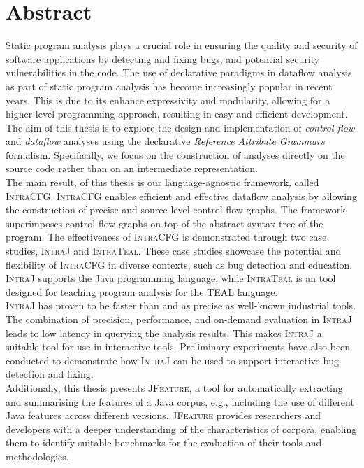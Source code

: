 \chapter{Abstract}


Static program analysis plays a crucial role in ensuring the quality and security of
software applications by detecting and fixing bugs,
and potential security vulnerabilities in the code. The use of declarative
paradigms in dataflow analysis as part of static program analysis has become 
increasingly popular in recent years. This is due to its enhance expressivity 
and modularity, allowing for a higher-level programming approach, resulting in
easy and efficient development.\\[5pt]

The aim of this thesis is to explore the design and implementation of \emph{control-flow} and 
\emph{dataflow} analyses using the declarative \emph{Reference Attribute Grammars} formalism.
Specifically, we focus on the construction of analyses directly on the source code
rather than on an intermediate representation.\\[5pt]

The main result, of this thesis is our language-agnostic framework, called \textsc{IntraCFG}.
\textsc{IntraCFG} enables efficient and effective dataflow analysis by allowing the construction of precise and
source-level control-flow graphs. The framework superimposes control-flow
graphs on top of the abstract syntax tree of the program. 
The effectiveness of \textsc{IntraCFG} is demonstrated through two case studies, 
\textsc{IntraJ} and \textsc{IntraTeal}. These case studies showcase the potential and 
flexibility of \textsc{IntraCFG} in diverse contexts, such as bug detection and education. 
\textsc{IntraJ} supports the Java programming language, while 
\textsc{IntraTeal} is an tool designed for teaching program analysis for the TEAL language.\\[5pt]

\textsc{IntraJ} has proven to be faster than and as precise as well-known
industrial tools. 
The combination of precision, performance, and on-demand evaluation in \textsc{IntraJ} 
leads to low latency in querying the analysis results. This makes \textsc{IntraJ} a
suitable tool for use in interactive tools. Preliminary experiments have also 
been conducted to demonstrate how \textsc{IntraJ} can be used to support interactive
bug detection and fixing.\\[5pt]

Additionally, this thesis presents \textsc{JFeature}, a tool for automatically extracting
and summarising the features of a Java corpus, e.g., including the use of different Java features across different
versions. \textsc{JFeature} provides 
researchers and developers with a deeper understanding of the characteristics of 
corpora, enabling them to identify suitable benchmarks for the evaluation of their 
tools and methodologies.
